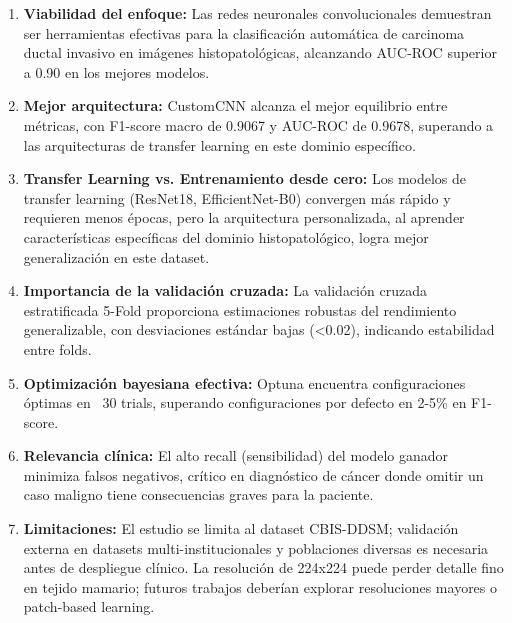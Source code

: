\documentclass[12pt,a4paper]{article}
\begin{document}
\begin{enumerate}
    \item \textbf{Viabilidad del enfoque:} Las redes neuronales convolucionales demuestran ser 
          herramientas efectivas para la clasificación automática de carcinoma ductal invasivo 
          en imágenes histopatológicas, alcanzando AUC-ROC superior a 0.90 en los mejores modelos.
    
    \item \textbf{Mejor arquitectura:} CustomCNN 
          alcanza el mejor equilibrio entre métricas, con F1-score macro de 0.9067 
          y AUC-ROC de 0.9678, 
          superando a las arquitecturas de transfer learning en este dominio específico.
    
    \item \textbf{Transfer Learning vs. Entrenamiento desde cero:} Los modelos de transfer learning 
          (ResNet18, EfficientNet-B0) convergen más rápido y requieren menos épocas, pero la 
          arquitectura personalizada, al aprender características específicas del dominio 
          histopatológico, logra mejor generalización en este dataset.
    
    \item \textbf{Importancia de la validación cruzada:} La validación cruzada estratificada 5-Fold 
          proporciona estimaciones robustas del rendimiento generalizable, con desviaciones 
          estándar bajas (<0.02), indicando estabilidad entre folds.
    
    \item \textbf{Optimización bayesiana efectiva:} Optuna encuentra configuraciones óptimas 
          en ~30 trials, superando configuraciones por defecto en 2-5\% en F1-score.
    
    \item \textbf{Relevancia clínica:} El alto recall (sensibilidad) del modelo ganador minimiza 
          falsos negativos, crítico en diagnóstico de cáncer donde omitir un caso maligno 
          tiene consecuencias graves para la paciente.
    
    \item \textbf{Limitaciones:} El estudio se limita al dataset CBIS-DDSM; validación externa 
          en datasets multi-institucionales y poblaciones diversas es necesaria antes de 
          despliegue clínico. La resolución de 224x224 puede perder detalle fino en tejido 
          mamario; futuros trabajos deberían explorar resoluciones mayores o patch-based learning.
\end{enumerate}
\end{document}
